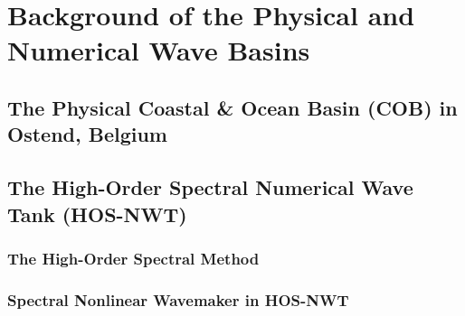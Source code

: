 \chapter{Background of the Physical and Numerical Wave Basins}\label{ch:background}


\section{The Physical Coastal \& Ocean Basin (COB) in Ostend, Belgium}


\section{The High-Order Spectral Numerical Wave Tank (HOS-NWT)}
\subsection{The High-Order Spectral Method}

\subsection{Spectral Nonlinear Wavemaker in HOS-NWT}

\cleardoublepage

